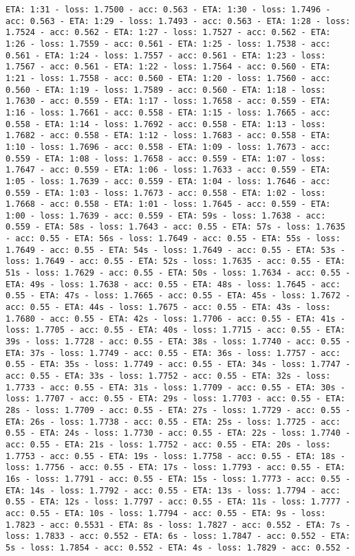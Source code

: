 \documentclass[11pt]{article}
\begin{document}
\begin{Verbatim}[commandchars=\\\{\}]
ETA: 1:31 - loss: 1.7500 - acc: 0.563 - ETA: 1:30 - loss: 1.7496 - acc: 0.563 - ETA: 1:29 - loss: 1.7493 - acc: 0.563 - ETA: 1:28 - loss: 1.7524 - acc: 0.562 - ETA: 1:27 - loss: 1.7527 - acc: 0.562 - ETA: 1:26 - loss: 1.7559 - acc: 0.561 - ETA: 1:25 - loss: 1.7538 - acc: 0.561 - ETA: 1:24 - loss: 1.7557 - acc: 0.561 - ETA: 1:23 - loss: 1.7567 - acc: 0.561 - ETA: 1:22 - loss: 1.7564 - acc: 0.560 - ETA: 1:21 - loss: 1.7558 - acc: 0.560 - ETA: 1:20 - loss: 1.7560 - acc: 0.560 - ETA: 1:19 - loss: 1.7589 - acc: 0.560 - ETA: 1:18 - loss: 1.7630 - acc: 0.559 - ETA: 1:17 - loss: 1.7658 - acc: 0.559 - ETA: 1:16 - loss: 1.7661 - acc: 0.558 - ETA: 1:15 - loss: 1.7665 - acc: 0.558 - ETA: 1:14 - loss: 1.7692 - acc: 0.558 - ETA: 1:13 - loss: 1.7682 - acc: 0.558 - ETA: 1:12 - loss: 1.7683 - acc: 0.558 - ETA: 1:10 - loss: 1.7696 - acc: 0.558 - ETA: 1:09 - loss: 1.7673 - acc: 0.559 - ETA: 1:08 - loss: 1.7658 - acc: 0.559 - ETA: 1:07 - loss: 1.7647 - acc: 0.559 - ETA: 1:06 - loss: 1.7633 - acc: 0.559 - ETA: 1:05 - loss: 1.7639 - acc: 0.559 - ETA: 1:04 - loss: 1.7646 - acc: 0.559 - ETA: 1:03 - loss: 1.7673 - acc: 0.558 - ETA: 1:02 - loss: 1.7668 - acc: 0.558 - ETA: 1:01 - loss: 1.7645 - acc: 0.559 - ETA: 1:00 - loss: 1.7639 - acc: 0.559 - ETA: 59s - loss: 1.7638 - acc: 0.559 - ETA: 58s - loss: 1.7643 - acc: 0.55 - ETA: 57s - loss: 1.7635 - acc: 0.55 - ETA: 56s - loss: 1.7649 - acc: 0.55 - ETA: 55s - loss: 1.7649 - acc: 0.55 - ETA: 54s - loss: 1.7649 - acc: 0.55 - ETA: 53s - loss: 1.7649 - acc: 0.55 - ETA: 52s - loss: 1.7635 - acc: 0.55 - ETA: 51s - loss: 1.7629 - acc: 0.55 - ETA: 50s - loss: 1.7634 - acc: 0.55 - ETA: 49s - loss: 1.7638 - acc: 0.55 - ETA: 48s - loss: 1.7645 - acc: 0.55 - ETA: 47s - loss: 1.7665 - acc: 0.55 - ETA: 45s - loss: 1.7672 - acc: 0.55 - ETA: 44s - loss: 1.7675 - acc: 0.55 - ETA: 43s - loss: 1.7680 - acc: 0.55 - ETA: 42s - loss: 1.7706 - acc: 0.55 - ETA: 41s - loss: 1.7705 - acc: 0.55 - ETA: 40s - loss: 1.7715 - acc: 0.55 - ETA: 39s - loss: 1.7728 - acc: 0.55 - ETA: 38s - loss: 1.7740 - acc: 0.55 - ETA: 37s - loss: 1.7749 - acc: 0.55 - ETA: 36s - loss: 1.7757 - acc: 0.55 - ETA: 35s - loss: 1.7749 - acc: 0.55 - ETA: 34s - loss: 1.7747 - acc: 0.55 - ETA: 33s - loss: 1.7752 - acc: 0.55 - ETA: 32s - loss: 1.7733 - acc: 0.55 - ETA: 31s - loss: 1.7709 - acc: 0.55 - ETA: 30s - loss: 1.7707 - acc: 0.55 - ETA: 29s - loss: 1.7703 - acc: 0.55 - ETA: 28s - loss: 1.7709 - acc: 0.55 - ETA: 27s - loss: 1.7729 - acc: 0.55 - ETA: 26s - loss: 1.7738 - acc: 0.55 - ETA: 25s - loss: 1.7725 - acc: 0.55 - ETA: 24s - loss: 1.7730 - acc: 0.55 - ETA: 22s - loss: 1.7740 - acc: 0.55 - ETA: 21s - loss: 1.7752 - acc: 0.55 - ETA: 20s - loss: 1.7753 - acc: 0.55 - ETA: 19s - loss: 1.7758 - acc: 0.55 - ETA: 18s - loss: 1.7756 - acc: 0.55 - ETA: 17s - loss: 1.7793 - acc: 0.55 - ETA: 16s - loss: 1.7791 - acc: 0.55 - ETA: 15s - loss: 1.7773 - acc: 0.55 - ETA: 14s - loss: 1.7792 - acc: 0.55 - ETA: 13s - loss: 1.7794 - acc: 0.55 - ETA: 12s - loss: 1.7797 - acc: 0.55 - ETA: 11s - loss: 1.7777 - acc: 0.55 - ETA: 10s - loss: 1.7794 - acc: 0.55 - ETA: 9s - loss: 1.7823 - acc: 0.5531 - ETA: 8s - loss: 1.7827 - acc: 0.552 - ETA: 7s - loss: 1.7833 - acc: 0.552 - ETA: 6s - loss: 1.7847 - acc: 0.552 - ETA: 5s - loss: 1.7854 - acc: 0.552 - ETA: 4s - loss: 1.7829 - acc: 0.552 - 
\end{Verbatim}
\end{document}
